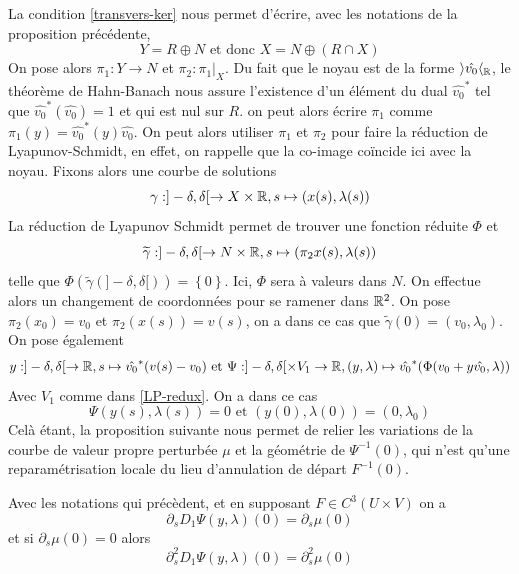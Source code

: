 \documentclass[memoire.tex]{subfiles}
\begin{document}
La  condition \eqref{transvers-ker}
nous permet d'écrire, avec les notations de la proposition précédente,
\begin{equation*}
    Y=R\oplus N\text{ et donc }
    X=N\oplus (R\cap X)
\end{equation*}
On pose alors $\pi_1: Y\rightarrow N$ et $\pi_2: \pi_1|_{X}$. Du fait que le noyau est de la forme $\rangle \hat{v_0}\langle_{\mathbb{R}}$, le théorème de Hahn-Banach nous assure l'existence d'un élément du dual $\hat{v_0}^*$ tel que $\hat{v_0}^{*}(\hat{v_0})=1$ et qui est nul sur $R$. on peut alors écrire $\pi_1$ comme $\pi_1(y)=\hat{v_0}^{*}(y)\hat{v_0}$. On peut alors utiliser $\pi_1$ et $\pi_2$ pour faire la réduction de Lyapunov-Schmidt, en effet, on rappelle que la co-image coïncide ici avec la noyau. Fixons alors une courbe de solutions
\begin{equation*}
    \gamma: ]-\delta,\delta[\rightarrow X\times \mathbb{R}, s\mapsto (x(s),\lambda(s))
\end{equation*}
La réduction de Lyapunov Schmidt permet de trouver une fonction réduite $\Phi$ et
\begin{equation*}
    \widetilde{\gamma}: ]-\delta,\delta[\rightarrow N\times \mathbb{R}, s\mapsto (\pi_2x(s),\lambda(s))
\end{equation*}
telle que $\Phi(\tilde{\gamma}(]-\delta,\delta[))=\left\{0\right\}$. Ici, $\Phi$ sera à valeurs dans $N$. On effectue alors un changement de coordonnées pour se ramener dans $\mathbb{R}^2$. On pose $\pi_2(x_0)=v_0$ et $\pi_2(x(s))=v(s)$, on a dans ce cas que $\tilde{\gamma}(0)=(v_0,\lambda_0)$. On pose également
\begin{equation*}
    y: ]-\delta,\delta[\rightarrow\mathbb{R},s\mapsto \hat{v_0}^*(v(s)-v_0)\text{ et }\Psi : ]-\delta,\delta[\times V_1\rightarrow \mathbb{R}, (y,\lambda)\mapsto \hat{v_0}^{*}(\Phi(v_0+y\hat{v_0},\lambda))
\end{equation*}
Avec $V_1$ comme dans \ref{LP-redux}. On a dans ce cas
\begin{equation*}
    \Psi(y(s),\lambda(s))=0\text{ et }(y(0),\lambda(0))=(0,\lambda_0)
\end{equation*}
Celà étant, la proposition suivante nous permet de relier les variations de la courbe de valeur propre perturbée $\mu$ et la géométrie de $\Psi^{-1}(0)$, qui n'est qu'une reparamétrisation locale du lieu d'annulation de départ $F^{-1}(0)$.
\begin{proposition}\label{prop-perturb-deriv}
    Avec les notations qui précèdent, et en supposant $F\in C^3(U\times V)$ on a
    \begin{equation*}
        \partial_s D_1 \Psi(y,\lambda)(0)=\partial_s \mu(0)
    \end{equation*}
    et si $\partial_s \mu(0)=0$ alors
    \begin{equation*}
        \partial^2_{s}D_1\Psi(y,\lambda)(0)=\partial^2_s\mu(0)
    \end{equation*}
\end{proposition}
\end{document}
